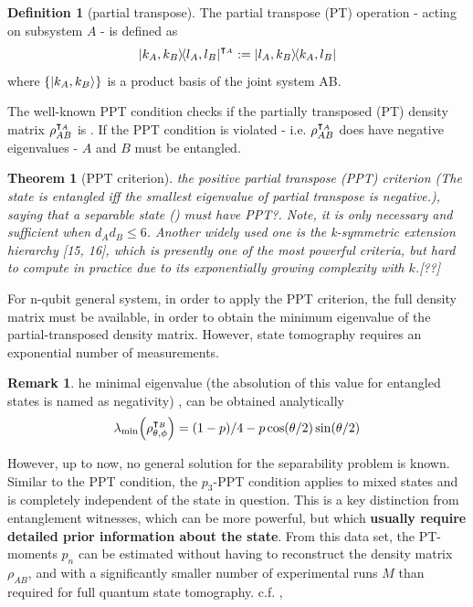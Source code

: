 \documentclass[
10pt,
aps,
pra,
linenumbers,
floatfix,
]{revtex4-2}
\theoremstyle{plain}
\newtheorem{theorem}{Theorem}
\theoremstyle{definition}
\newtheorem{definition}{Definition}
\newtheorem{remark}{Remark}
\newcommand{\ppt}{\textup{PPT}}
\newcommand{\dm}{\rho}
\begin{document}
\begin{definition}[partial transpose]\label{def:partial_transpose}
	\cite{horodeckiSeparabilityMixedStates1996}
	The partial transpose (PT) operation - acting on subsystem $A$ - is defined as
	\begin{equation}
		\op{k_A,k_B}{l_A,l_B}^{\intercal_A}
		:= \op{l_A,k_B}{k_A,l_B}
	\end{equation}
	where $\qty{\ket{k_A,k_B}}$ is a product basis of the joint system AB.
\end{definition}
The well-known PPT condition checks if the partially transposed (PT) density matrix $\dm_{AB}^{\T_A}$ is .
If the PPT condition is violated - i.e. $\dm_{AB}^{\T_A}$ does have negative eigenvalues - $A$ and $B$ must be entangled.
\begin{theorem}[PPT criterion]\label{thm:ppt}
	\cite{horodeckiSeparabilityMixedStates1996}
	the positive partial transpose (\ppt) criterion (The state is entangled iff the smallest eigenvalue of partial transpose is negative.), saying that a separable state () must have PPT?.
	Note, it is only necessary and sufficient when $d_A d_B \le 6$.
	Another widely used one is the k-symmetric extension hierarchy [15, 16], which is presently one of the most powerful criteria, but hard to compute in practice due to its exponentially growing complexity with $k$.[??]
\end{theorem}
For n-qubit general system, in order to apply the PPT criterion, the full density matrix must be available, in order to obtain the minimum eigenvalue of the partial-transposed density matrix. However, state tomography requires an exponential number of measurements.
\begin{remark}
	he minimal eigenvalue (the absolution of this value for entangled states is named as negativity) , can be obtained analytically \cite{maTransformingBellInequalities2018}
	\begin{equation}
		\lambda_{\min}\qty(\dm_{\theta,\phi}^{\T_B}) = 
		(1-p)/4 - p \cos(\theta/2) \sin(\theta/2)
	\end{equation}
\end{remark}

However, up to now, no general solution for the separability problem is known.
Similar to the PPT condition, the $p_3$-PPT condition applies to mixed states and is completely independent of the state in question. This is a key distinction from entanglement witnesses, which can be more powerful, but which \textbf{usually require detailed prior information about the state}.
From this data set, the PT-moments $p_n$ can be estimated without having to reconstruct the density matrix $\dm_{AB}$, and with a significantly smaller number of experimental runs $M$ than required for full quantum state tomography.
c.f. , 
\end{document}
